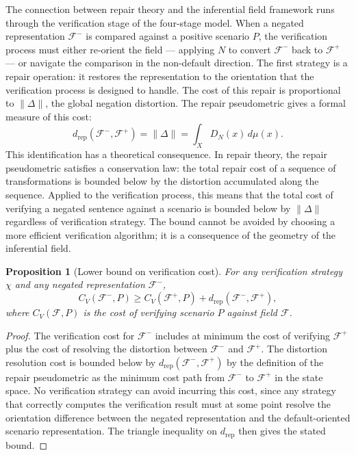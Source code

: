 \documentclass[12pt]{article}
\newtheorem{proposition}[theorem]{Proposition}
\theoremstyle{remark}
\begin{document}
The connection between repair theory and the inferential field framework
runs through the verification stage of the four-stage model. When a
negated representation $\mathcal{F}^-$ is compared against a positive
scenario $P$, the verification process must either re-orient the field
--- applying $N$ to convert $\mathcal{F}^-$ back to $\mathcal{F}^+$ ---
or navigate the comparison in the non-default direction. The first
strategy is a repair operation: it restores the representation to the
orientation that the verification process is designed to handle. The cost
of this repair is proportional to $\|\Delta\|$, the global negation
distortion. The repair pseudometric gives a formal measure of this cost:
\[
d_{\mathrm{rep}}(\mathcal{F}^-, \mathcal{F}^+) = \|\Delta\| =
\int_X D_N(x)\, d\mu(x).
\]
This identification has a theoretical consequence. In repair theory, the
repair pseudometric satisfies a conservation law: the total repair cost
of a sequence of transformations is bounded below by the distortion
accumulated along the sequence. Applied to the verification process, this
means that the total cost of verifying a negated sentence against a
scenario is bounded below by $\|\Delta\|$ regardless of verification
strategy. The bound cannot be avoided by choosing a more efficient
verification algorithm; it is a consequence of the geometry of the
inferential field.

\begin{proposition}[Lower bound on verification cost]
\label{prop:lower-bound}
For any verification strategy $\chi$ and any negated representation
$\mathcal{F}^-$,
\[
C_V(\mathcal{F}^-, P) \geq C_V(\mathcal{F}^+, P) +
d_{\mathrm{rep}}(\mathcal{F}^-, \mathcal{F}^+),
\]
where $C_V(\mathcal{F}, P)$ is the cost of verifying scenario $P$
against field $\mathcal{F}$.
\end{proposition}
\begin{proof}
The verification cost for $\mathcal{F}^-$ includes at minimum the cost
of verifying $\mathcal{F}^+$ plus the cost of resolving the distortion
between $\mathcal{F}^-$ and $\mathcal{F}^+$. The distortion resolution
cost is bounded below by $d_{\mathrm{rep}}(\mathcal{F}^-, \mathcal{F}^+)$
by the definition of the repair pseudometric as the minimum cost path
from $\mathcal{F}^-$ to $\mathcal{F}^+$ in the state space. No
verification strategy can avoid incurring this cost, since any strategy
that correctly computes the verification result must at some point resolve
the orientation difference between the negated representation and the
default-oriented scenario representation. The triangle inequality on
$d_{\mathrm{rep}}$ then gives the stated bound.
\end{proof}
\end{document}
